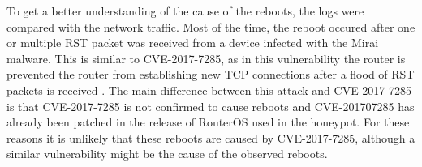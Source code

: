 To get a better understanding of the cause of the reboots, the logs were compared with the network traffic. Most of the time, the reboot occured after one or multiple RST packet was received from a device infected with the Mirai malware. This is similar to CVE-2017-7285, as in this vulnerability the router is prevented the router from establishing new TCP connections after a flood of RST packets is received \cite{CVE-2017-7285:CXSECURIITY:2017}. The main difference between this attack and CVE-2017-7285 is that CVE-2017-7285 is not confirmed to cause reboots and CVE-201707285 has already been patched in the release of RouterOS used in the honeypot. For these reasons it is unlikely that these reboots are caused by CVE-2017-7285, although a similar vulnerability might be the cause of the observed reboots.